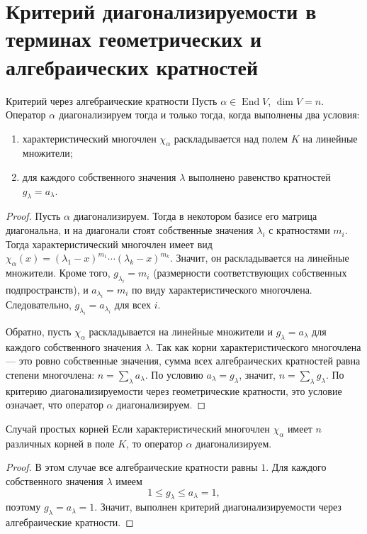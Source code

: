 
\section{Критерий диагонализируемости в терминах геометрических и алгебраических кратностей}

\begin{Theorem}{Критерий через алгебраические кратности}{}
	Пусть $\alpha\in\operatorname{End} V$, $\dim V=n$. Оператор $\alpha$ диагонализируем тогда и только тогда, когда выполнены два условия:
	\begin{enumerate}
		\item характеристический многочлен $\chi_\alpha$ раскладывается над полем $K$ на линейные множители;
		\item для каждого собственного значения $\lambda$ выполнено равенство кратностей $g_\lambda=a_\lambda$.
	\end{enumerate}
\end{Theorem}

\begin{proof}
	Пусть $\alpha$ диагонализируем. Тогда в некотором базисе его матрица диагональна, и на диагонали стоят собственные значения $\lambda_i$ с кратностями $m_i$. Тогда характеристический многочлен имеет вид $\chi_\alpha(x) = (\lambda_1-x)^{m_1}\cdots(\lambda_k-x)^{m_k}$. Значит, он раскладывается на линейные множители. Кроме того, $g_{\lambda_i}=m_i$ (размерности соответствующих собственных подпространств), и $a_{\lambda_i}=m_i$ по виду характеристического многочлена. Следовательно, $g_{\lambda_i}=a_{\lambda_i}$ для всех $i$.

	Обратно, пусть $\chi_\alpha$ раскладывается на линейные множители и $g_\lambda=a_\lambda$ для каждого собственного значения $\lambda$. Так как корни характеристического многочлена --- это ровно собственные значения, сумма всех алгебраических кратностей равна степени многочлена: $n=\sum_{\lambda} a_\lambda$. По условию $a_\lambda=g_\lambda$, значит, $n=\sum_{\lambda} g_\lambda$. По критерию диагонализируемости через геометрические кратности, это условие означает, что оператор $\alpha$ диагонализируем.
\end{proof}

\begin{Corollary}{Случай простых корней}{}
	Если характеристический многочлен $\chi_\alpha$ имеет $n$ различных корней в поле $K$,
	то оператор $\alpha$ диагонализируем.
\end{Corollary}

\begin{proof}
	В этом случае все алгебраические кратности равны $1$.
	Для каждого собственного значения $\lambda$ имеем
	\[
	1\le g_\lambda\le a_\lambda=1,
	\]
	поэтому $g_\lambda=a_\lambda=1$.
	Значит, выполнен критерий диагонализируемости через алгебраические кратности.
\end{proof}